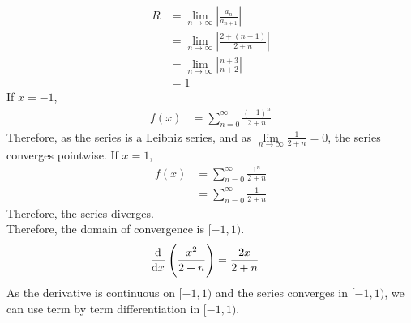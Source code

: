 \documentclass[fleqn, a4paper, 11pt, oneside]{amsart}
\theoremstyle{definition}
\theoremstyle{theorem}
\begin{document}
\begin{solution}
	\begin{align*}
		R & = \lim\limits_{n \to \infty} \left| \frac{a_n}{a_{n + 1}} \right|     \\
                  & = \lim\limits_{n \to \infty} \left| \frac{2 + (n + 1)}{2 + n} \right| \\
                  & = \lim\limits_{n \to \infty} \left| \frac{n + 3}{n + 2} \right|       \\
                  & = 1
	\end{align*}
	If $x = -1$,
	\begin{align*}
		f(x) & = \sum\limits_{n = 0}^{\infty} \frac{(-1)^n}{2 + n}
	\end{align*}
	Therefore, as the series is a Leibniz series, and as $\lim\limits_{n \to \infty} \frac{1}{2 + n} = 0$, the series converges pointwise.
	If $x = 1$,
	\begin{align*}
		f(x) & = \sum\limits_{n = 0}^{\infty} \frac{1^n}{2 + n} \\
                     & = \sum\limits_{n = 0}^{\infty} \frac{1}{2 + n}
	\end{align*}
	Therefore, the series diverges.\\
	Therefore, the domain of convergence is $[-1,1)$.\\
	\begin{align*}
		\dod{}{x} \left( \frac{x^2}{2 + n} \right) & = \frac{2 x}{2 + n}
	\end{align*}
	As the derivative is continuous on $[-1,1)$ and the series converges in $[-1,1)$, we can use term by term differentiation in $[-1,1)$.
\end{solution}
\end{document}
